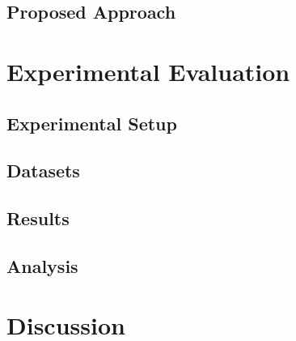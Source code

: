 \documentclass[11pt,a4paper]{article}
\begin{document}
\subsection{Proposed Approach}
\label{subsec:approach}


\section{Experimental Evaluation}
\label{sec:experiments}


\subsection{Experimental Setup}
\label{subsec:setup}


\subsection{Datasets}
\label{subsec:datasets}

\subsection{Results}
\label{subsec:results}


\subsection{Analysis}
\label{subsec:analysis}


\section{Discussion}
\label{sec:discussion}
\end{document}
